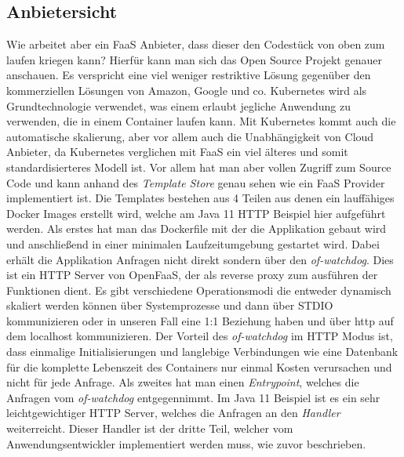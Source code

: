 \documentclass[12pt, a4paper]{article}
\begin{document}
\subsection{Anbietersicht}
Wie arbeitet aber ein \ac{FaaS} Anbieter, dass dieser den Codestück von oben zum laufen kriegen kann?
\newline
Hierfür kann man sich das Open Source Projekt \cite[OpenFaaS]{openfaas_github} genauer anschauen.
Es verspricht eine viel weniger restriktive Lösung gegenüber den kommerziellen Lösungen von Amazon, Google und co.
Kubernetes wird als Grundtechnologie verwendet, was einem erlaubt jegliche Anwendung zu verwenden, die in einem Container laufen kann.
Mit Kubernetes kommt auch die automatische skalierung, aber vor allem auch die Unabhängigkeit von Cloud Anbieter, da Kubernetes verglichen mit \ac{FaaS} ein viel älteres und somit standardisierteres Modell ist.
\newline
Vor allem hat man aber vollen Zugriff zum Source Code und kann anhand des \emph{Template Store}\cite{openfaas_templateStore} genau sehen wie ein \ac{FaaS} Provider implementiert ist.
Die Templates bestehen aus 4 Teilen aus denen ein lauffähiges Docker Images erstellt wird, welche am Java 11 HTTP Beispiel \cite{openfaas_templateStore_java11} hier aufgeführt werden.
\newline
Als erstes hat man das Dockerfile mit der die Applikation gebaut wird und anschließend in einer minimalen Laufzeitumgebung gestartet wird.
\newline
Dabei erhält die Applikation Anfragen nicht direkt sondern über den \emph{of-watchdog}\cite{openfaas_ofWatchdog}.
Dies ist ein HTTP Server von OpenFaaS, der als reverse proxy zum ausführen der Funktionen dient.
Es gibt verschiedene Operationsmodi die entweder dynamisch skaliert werden können über Systemprozesse und dann über STDIO kommunizieren oder in unseren Fall eine 1:1 Beziehung haben und über http auf dem localhost kommunizieren.
Der Vorteil des \emph{of-watchdog} im HTTP Modus ist, dass einmalige Initialisierungen und langlebige Verbindungen wie eine Datenbank für die komplette Lebenszeit des Containers nur einmal Kosten verursachen und nicht für jede Anfrage.
\newline
Als zweites hat man einen \emph{Entrypoint}, welches die Anfragen vom \emph{of-watchdog} entgegennimmt. Im Java 11 Beispiel ist es ein sehr leichtgewichtiger HTTP Server, welches die Anfragen an den \emph{Handler} weiterreicht.
\newline
Dieser Handler ist der dritte Teil, welcher vom Anwendungsentwickler implementiert werden muss, wie zuvor beschrieben.
\end{document}
